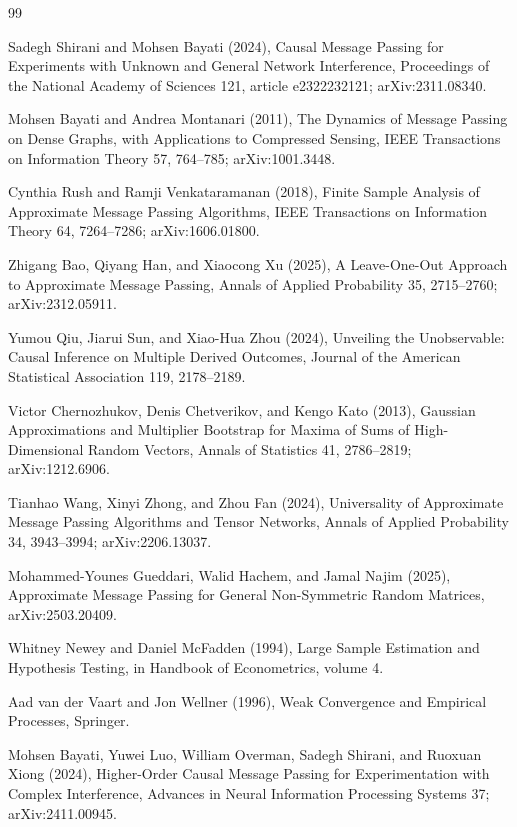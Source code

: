 \documentclass{article}
\begin{document}
\begin{thebibliography}{99}

   Sadegh Shirani and Mohsen Bayati (2024), Causal Message Passing for Experiments with Unknown and General Network Interference, Proceedings of the National Academy of Sciences 121, article e2322232121; arXiv:2311.08340.

   Mohsen Bayati and Andrea Montanari (2011), The Dynamics of Message Passing on Dense Graphs, with Applications to Compressed Sensing, IEEE Transactions on Information Theory 57, 764--785; arXiv:1001.3448.

   Cynthia Rush and Ramji Venkataramanan (2018), Finite Sample Analysis of Approximate Message Passing Algorithms, IEEE Transactions on Information Theory 64, 7264--7286; arXiv:1606.01800.

   Zhigang Bao, Qiyang Han, and Xiaocong Xu (2025), A Leave-One-Out Approach to Approximate Message Passing, Annals of Applied Probability 35, 2715--2760; arXiv:2312.05911.

   Yumou Qiu, Jiarui Sun, and Xiao-Hua Zhou (2024), Unveiling the Unobservable: Causal Inference on Multiple Derived Outcomes, Journal of the American Statistical Association 119, 2178--2189.

   Victor Chernozhukov, Denis Chetverikov, and Kengo Kato (2013), Gaussian Approximations and Multiplier Bootstrap for Maxima of Sums of High-Dimensional Random Vectors, Annals of Statistics 41, 2786--2819; arXiv:1212.6906.

   Tianhao Wang, Xinyi Zhong, and Zhou Fan (2024), Universality of Approximate Message Passing Algorithms and Tensor Networks, Annals of Applied Probability 34, 3943--3994; arXiv:2206.13037.

   Mohammed-Younes Gueddari, Walid Hachem, and Jamal Najim (2025), Approximate Message Passing for General Non-Symmetric Random Matrices, arXiv:2503.20409.

   Whitney Newey and Daniel McFadden (1994), Large Sample Estimation and Hypothesis Testing, in Handbook of Econometrics, volume 4.

   Aad van der Vaart and Jon Wellner (1996), Weak Convergence and Empirical Processes, Springer.

   Mohsen Bayati, Yuwei Luo, William Overman, Sadegh Shirani, and Ruoxuan Xiong (2024), Higher-Order Causal Message Passing for Experimentation with Complex Interference, Advances in Neural Information Processing Systems 37; arXiv:2411.00945.

\end{thebibliography}
\end{document}
